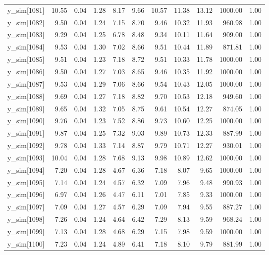 \begin{table}[ht]
\begin{tabular}{rrrrrrrrrrr}
  y\_sim[1081] & 10.55 & 0.04 & 1.28 & 8.17 & 9.66 & 10.57 & 11.38 & 13.12 & 1000.00 & 1.00 \\ 
  y\_sim[1082] & 9.50 & 0.04 & 1.24 & 7.15 & 8.70 & 9.46 & 10.32 & 11.93 & 960.98 & 1.00 \\ 
  y\_sim[1083] & 9.29 & 0.04 & 1.25 & 6.78 & 8.48 & 9.34 & 10.11 & 11.64 & 909.00 & 1.00 \\ 
  y\_sim[1084] & 9.53 & 0.04 & 1.30 & 7.02 & 8.66 & 9.51 & 10.44 & 11.89 & 871.81 & 1.00 \\ 
  y\_sim[1085] & 9.51 & 0.04 & 1.23 & 7.18 & 8.72 & 9.51 & 10.33 & 11.78 & 1000.00 & 1.00 \\ 
  y\_sim[1086] & 9.50 & 0.04 & 1.27 & 7.03 & 8.65 & 9.46 & 10.35 & 11.92 & 1000.00 & 1.00 \\ 
  y\_sim[1087] & 9.53 & 0.04 & 1.29 & 7.06 & 8.66 & 9.54 & 10.43 & 12.05 & 1000.00 & 1.00 \\ 
  y\_sim[1088] & 9.69 & 0.04 & 1.27 & 7.18 & 8.82 & 9.70 & 10.53 & 12.18 & 949.60 & 1.00 \\ 
  y\_sim[1089] & 9.65 & 0.04 & 1.32 & 7.05 & 8.75 & 9.61 & 10.54 & 12.27 & 874.05 & 1.00 \\ 
  y\_sim[1090] & 9.76 & 0.04 & 1.23 & 7.52 & 8.86 & 9.73 & 10.60 & 12.25 & 1000.00 & 1.00 \\ 
  y\_sim[1091] & 9.87 & 0.04 & 1.25 & 7.32 & 9.03 & 9.89 & 10.73 & 12.33 & 887.99 & 1.00 \\ 
  y\_sim[1092] & 9.78 & 0.04 & 1.33 & 7.14 & 8.87 & 9.79 & 10.71 & 12.27 & 930.01 & 1.00 \\ 
  y\_sim[1093] & 10.04 & 0.04 & 1.28 & 7.68 & 9.13 & 9.98 & 10.89 & 12.62 & 1000.00 & 1.00 \\ 
  y\_sim[1094] & 7.20 & 0.04 & 1.28 & 4.67 & 6.36 & 7.18 & 8.07 & 9.65 & 1000.00 & 1.00 \\ 
  y\_sim[1095] & 7.14 & 0.04 & 1.24 & 4.57 & 6.32 & 7.09 & 7.96 & 9.48 & 990.93 & 1.00 \\ 
  y\_sim[1096] & 6.97 & 0.04 & 1.26 & 4.47 & 6.11 & 7.01 & 7.85 & 9.33 & 1000.00 & 1.00 \\ 
  y\_sim[1097] & 7.09 & 0.04 & 1.27 & 4.57 & 6.29 & 7.09 & 7.94 & 9.55 & 887.27 & 1.00 \\ 
  y\_sim[1098] & 7.26 & 0.04 & 1.24 & 4.64 & 6.42 & 7.29 & 8.13 & 9.59 & 968.24 & 1.00 \\ 
  y\_sim[1099] & 7.13 & 0.04 & 1.28 & 4.68 & 6.29 & 7.15 & 7.98 & 9.59 & 1000.00 & 1.00 \\ 
  y\_sim[1100] & 7.23 & 0.04 & 1.24 & 4.89 & 6.41 & 7.18 & 8.10 & 9.79 & 881.99 & 1.00 \\ 

\end{tabular}
\end{table}
